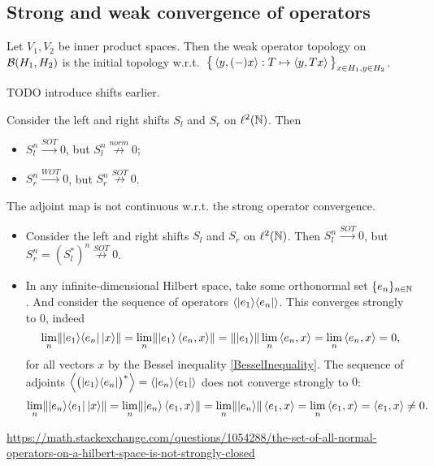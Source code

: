 \subsection{Strong and weak convergence of operators}
\begin{lemma}
Let $V_1,V_2$ be inner product spaces. Then the weak operator topology on $\operatorname{\mathcal{B}}(H_1,H_2)$ is the initial topology w.r.t.\ $\big\{\left\langle y, (-)x \right\rangle: T\mapsto \left\langle y,Tx \right\rangle\big\}_{x\in H_1, y\in H_2}$.
\end{lemma}

TODO introduce shifts earlier. \label{adjointMapNotSOTContinuous}
\begin{example}
Consider the left and right shifts $S_l$ and $S_r$ on $\ell^2(\mathbb{N})$. Then
\begin{itemize}
\item $S_l^n \overset{SOT}{\longrightarrow} 0$, but $S_l^n \overset{norm}{\not\longrightarrow} 0$;
\item $S_r^n \overset{WOT}{\longrightarrow} 0$, but $S_r^n \overset{SOT}{\not\longrightarrow} 0$.
\end{itemize}
\end{example}

\begin{example}
The adjoint map is not continuous w.r.t. the strong operator convergence.
\begin{itemize}
\item Consider the left and right shifts $S_l$ and $S_r$ on $\ell^2(\mathbb{N})$. Then $S_l^n \overset{SOT}{\longrightarrow} 0$, but $S_r^n = (S_l^*)^n \overset{SOT}{\not\longrightarrow} 0$.
\item In any infinite-dimensional Hilbert space, take some orthonormal set $\{e_n\}_{n\in \mathbb{N}}$. And consider the sequence of operators $\left\langle |e_1\rangle\langle e_n| \right\rangle$. This converges strongly to $0$, indeed
\[ \lim_n\lVert|e_1\rangle\langle e_n|\left| x \right\rangle\rVert = \lim_n\lVert\left| e_1 \right\rangle\left\langle e_n, x \right\rangle\rVert = \lVert\left| e_1 \right\rangle\rVert\lim_n\left\langle e_n, x \right\rangle = \lim_n\left\langle e_n, x \right\rangle = 0, \]
for all vectors $x$ by the Bessel inequality \ref{BesselInequality}. The sequence of adjoints $\left\langle \big(|e_1\rangle\langle e_n|\big)^* \right\rangle = \left\langle |e_n\rangle\langle e_1| \right\rangle$ does not converge strongly to $0$:
\[ \lim_n\lVert|e_n\rangle\langle e_1|\left| x \right\rangle\rVert = \lim_n\lVert\left| e_n \right\rangle\left\langle e_1, x \right\rangle\rVert = \lim_n\lVert\left| e_n \right\rangle\rVert\left\langle e_1, x \right\rangle = \lim_n\left\langle e_1, x \right\rangle = \left\langle e_1, x \right\rangle \neq 0. \]
\end{itemize}
\end{example}

\url{https://math.stackexchange.com/questions/1054288/the-set-of-all-normal-operators-on-a-hilbert-space-is-not-strongly-closed}


